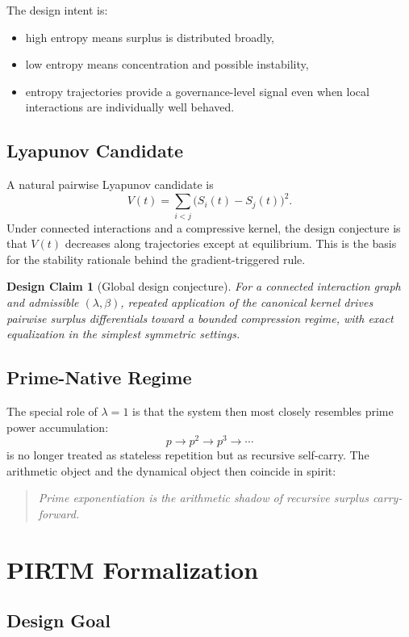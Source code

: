 \documentclass[11pt]{article}
\newtheorem{designclaim}{Design Claim}
\begin{document}
The design intent is:
\begin{itemize}[leftmargin=2em]
  \item high entropy means surplus is distributed broadly,
  \item low entropy means concentration and possible instability,
  \item entropy trajectories provide a governance-level signal even when local interactions are individually well behaved.
\end{itemize}

\subsection{Lyapunov Candidate}

A natural pairwise Lyapunov candidate is
\[
V(t)=\sum_{i<j}\bigl(S_i(t)-S_j(t)\bigr)^2.
\]
Under connected interactions and a compressive kernel, the design conjecture is that \(V(t)\) decreases along trajectories except at equilibrium. This is the basis for the stability rationale behind the gradient-triggered rule.

\begin{designclaim}[Global design conjecture]
For a connected interaction graph and admissible \((\lambda,\beta)\), repeated application of the canonical kernel drives pairwise surplus differentials toward a bounded compression regime, with exact equalization in the simplest symmetric settings.
\end{designclaim}

\subsection{Prime-Native Regime}

The special role of \(\lambda=1\) is that the system then most closely resembles prime power accumulation:
\[
p \to p^2 \to p^3 \to \cdots
\]
is no longer treated as stateless repetition but as recursive self-carry. The arithmetic object and the dynamical object then coincide in spirit:
\begin{quote}
\emph{Prime exponentiation is the arithmetic shadow of recursive surplus carry-forward.}
\end{quote}

\section{PIRTM Formalization}

\subsection{Design Goal}
\end{document}

